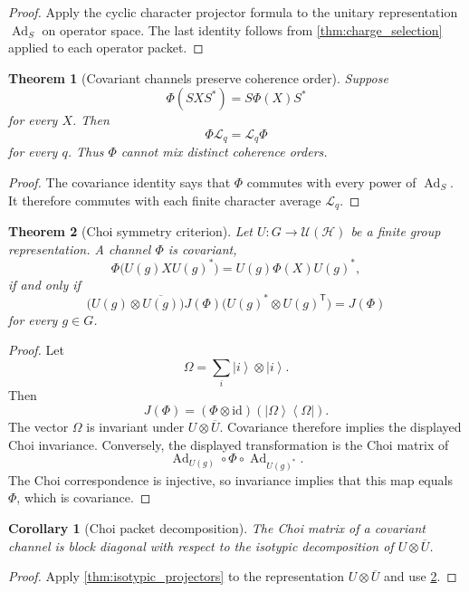 \documentclass{aomart}
\newtheorem{theorem}{Theorem}[section]
\newtheorem{corollary}[corollary]{Corollary}
\theoremstyle{definition}
\theoremstyle{remark}
\newcommand{\Hcal}{\mathcal H}
\newcommand{\Lcal}{\mathcal L}
\newcommand{\Ucal}{\mathcal U}
\newcommand{\id}{\mathrm{id}}
\newcommand{\ket}[1]{\left|#1\right\rangle}
\newcommand{\bra}[1]{\left\langle#1\right|}
\newcommand{\Ad}{\operatorname{Ad}}
\begin{document}
\begin{proof}
Apply the cyclic character projector formula to the unitary representation \(\Ad_S\) on operator space. The last identity follows from \cref{thm:charge_selection} applied to each operator packet.
\end{proof}

\begin{theorem}[Covariant channels preserve coherence order]\label{thm:covariant_channel}
Suppose
\[
\Phi(SXS^*)=S\Phi(X)S^*
\]
for every \(X\). Then
\[
\Phi\Lcal_q=\Lcal_q\Phi
\]
for every \(q\). Thus \(\Phi\) cannot mix distinct coherence orders.
\end{theorem}

\begin{proof}
The covariance identity says that \(\Phi\) commutes with every power of \(\Ad_S\). It therefore commutes with each finite character average \(\Lcal_q\).
\end{proof}

\begin{theorem}[Choi symmetry criterion]\label{thm:choi_covariance}
Let \(U:G\to\Ucal(\Hcal)\) be a finite group representation. A channel \(\Phi\) is covariant,
\[
\Phi\bigl(U(g)XU(g)^*\bigr)
=
U(g)\Phi(X)U(g)^*,
\]
if and only if
\[
\bigl(U(g)\otimes\overline{U(g)}\bigr)
J(\Phi)
\bigl(U(g)^*\otimes U(g)^{\mathsf T}\bigr)
=
J(\Phi)
\]
for every \(g\in G\).
\end{theorem}

\begin{proof}
Let
\[
\Omega=\sum_i\ket{i}\otimes\ket{i}.
\]
Then
\[
J(\Phi)=(\Phi\otimes\id)(\ket{\Omega}\bra{\Omega}).
\]
The vector \(\Omega\) is invariant under \(U\otimes\overline U\). Covariance therefore implies the displayed Choi invariance. Conversely, the displayed transformation is the Choi matrix of
\[
\Ad_{U(g)}\circ\Phi\circ\Ad_{U(g)^*}.
\]
The Choi correspondence is injective, so invariance implies that this map equals \(\Phi\), which is covariance.
\end{proof}

\begin{corollary}[Choi packet decomposition]\label{cor:choi_packets}
The Choi matrix of a covariant channel is block diagonal with respect to the isotypic decomposition of \(U\otimes\overline U\).
\end{corollary}

\begin{proof}
Apply \cref{thm:isotypic_projectors} to the representation \(U\otimes\overline U\) and use \cref{thm:choi_covariance}.
\end{proof}
\end{document}
